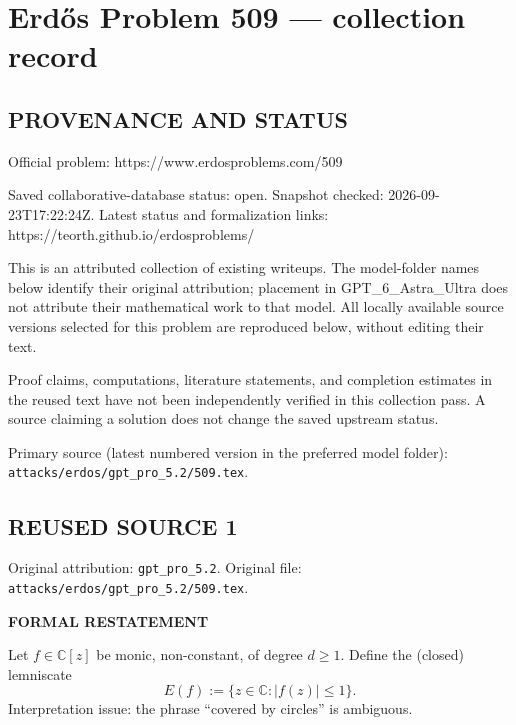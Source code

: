 \section*{Erd\H{o}s Problem 509 --- collection record}

\subsection*{PROVENANCE AND STATUS}
Official problem: https://www.erdosproblems.com/509

Saved collaborative-database status: open.
Snapshot checked: 2026-09-23T17:22:24Z.
Latest status and formalization links: https://teorth.github.io/erdosproblems/

This is an attributed collection of existing writeups. The model-folder names below identify their original attribution; placement in GPT\_6\_Astra\_Ultra does not attribute their mathematical work to that model. All locally available source versions selected for this problem are reproduced below, without editing their text.

Proof claims, computations, literature statements, and completion estimates in the reused text have not been independently verified in this collection pass. A source claiming a solution does not change the saved upstream status.

Primary source (latest numbered version in the preferred model folder): \texttt{attacks/erdos/gpt\_pro\_5.2/509.tex}.

\subsection*{REUSED SOURCE 1}
Original attribution: \texttt{gpt\_pro\_5.2}.
Original file: \texttt{attacks/erdos/gpt\_pro\_5.2/509.tex}.


\noindent\textbf{FORMAL RESTATEMENT}

Let $f\in\mathbb{C}[z]$ be monic, non-constant, of degree $d\ge 1$. Define the (closed) lemniscate
\[
E(f):=\{z\in\mathbb{C}: |f(z)|\le 1\}.
\]
Interpretation issue: the phrase ``covered by circles'' is ambiguous.

